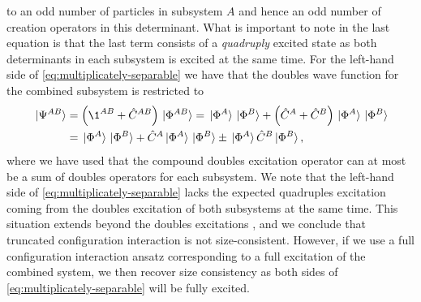             to an odd number of particles in subsystem $A$ and hence an odd
            number of creation operators in this determinant.
            What is important to note in the last equation is that the last term
            consists of a \emph{quadruply} excited state as both determinants in
            each subsystem is excited at the same time.
            For the left-hand side of \autoref{eq:multiplicately-separable} we
            have that the doubles wave function for the combined subsystem is
            restricted to
            \begin{align}
                \ket*{\Psi^{AB}}
                &= \para{\1^{AB} + \hat{C}^{AB}}\ket*{\slat^{AB}}
                = \ket*{\slat^{A}}\ket*{\slat^{B}}
                + \para{\hat{C}^{A} + \hat{C}^{B}}
                \ket*{\slat^{A}}\ket*{\slat^{B}}
                \\
                &=
                \ket*{\slat^{A}}\ket*{\slat^{B}}
                + \hat{C}^{A}\ket*{\slat^{A}}\ket*{\slat^{B}}
                \pm \ket*{\slat^{A}}\hat{C}^{B}\ket*{\slat^{B}},
            \end{align}
            where we have used that the compound doubles excitation operator can
            at most be a sum of doubles operators for each subsystem.
            We note that the left-hand side of
            \autoref{eq:multiplicately-separable} lacks the expected quadruples
            excitation coming from the doubles excitation of both subsystems at
            the same time.
            This situation extends beyond the doubles excitations
            \cite{size-extensivity}, and we conclude that truncated
            configuration interaction is not size-consistent.
            However, if we use a full configuration interaction ansatz
            corresponding to a full excitation of the combined system, we then
            recover size consistency as both sides of
            \autoref{eq:multiplicately-separable} will be fully excited.

